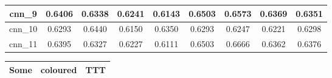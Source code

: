 \begin{table}[h]
\begin{tabular} {|c|c|c|c|c|c|c|c|c| }
        cnn\_9   & 0.6406                        & 0.6338                         & 0.6241                      & 0.6143                  & 0.6503 & 0.6573 & 0.6369 & 0.6351 \\ \hline
        cnn\_10  & 0.6293                        & 0.6440                         & 0.6150                      & 0.6350                  & 0.6293 & 0.6247 & 0.6221 & 0.6298 \\ \hline
        cnn\_11  & 0.6395                        & 0.6327                         & 0.6227                      & 0.6111                  & 0.6503 & 0.6666 & 0.6362 & 0.6376 \\ \hline
    \end{tabular}
\end{table}

\begin{tabular}{l|c|r}
    \hline
    Some & \textbf{\cellcolor{green!50}coloured} & \textbf{\cellcolor{green!50}TTT} \\
    \hline
  \end{tabular}

